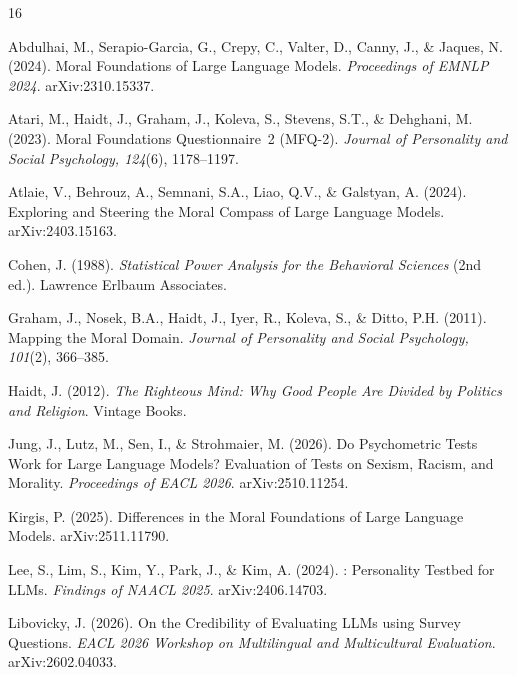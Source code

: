 \documentclass{article}
\begin{document}
\begin{thebibliography}{16}

Abdulhai, M., Serapio-Garcia, G., Crepy, C., Valter, D., Canny, J., \& Jaques, N. (2024).
\newblock Moral Foundations of Large Language Models.
\newblock \emph{Proceedings of EMNLP 2024}. arXiv:2310.15337.

Atari, M., Haidt, J., Graham, J., Koleva, S., Stevens, S.T., \& Dehghani, M. (2023).
\newblock Moral Foundations Questionnaire~2 ({MFQ-2}).
\newblock \emph{Journal of Personality and Social Psychology, 124}(6), 1178--1197.

Atlaie, V., Behrouz, A., Semnani, S.A., Liao, Q.V., \& Galstyan, A. (2024).
\newblock Exploring and Steering the Moral Compass of Large Language Models.
\newblock arXiv:2403.15163.

Cohen, J. (1988).
\newblock \emph{Statistical Power Analysis for the Behavioral Sciences} (2nd ed.).
\newblock Lawrence Erlbaum Associates.

Graham, J., Nosek, B.A., Haidt, J., Iyer, R., Koleva, S., \& Ditto, P.H. (2011).
\newblock Mapping the Moral Domain.
\newblock \emph{Journal of Personality and Social Psychology, 101}(2), 366--385.

Haidt, J. (2012).
\newblock \emph{The Righteous Mind: Why Good People Are Divided by Politics and Religion}.
\newblock Vintage Books.

Jung, J., Lutz, M., Sen, I., \& Strohmaier, M. (2026).
\newblock Do Psychometric Tests Work for Large Language Models? Evaluation of Tests on Sexism, Racism, and Morality.
\newblock \emph{Proceedings of EACL 2026}. arXiv:2510.11254.

Kirgis, P. (2025).
\newblock Differences in the Moral Foundations of Large Language Models.
\newblock arXiv:2511.11790.

Lee, S., Lim, S., Kim, Y., Park, J., \& Kim, A. (2024).
: Personality Testbed for {LLMs}.
\newblock \emph{Findings of NAACL 2025}. arXiv:2406.14703.

Libovicky, J. (2026).
\newblock On the Credibility of Evaluating {LLMs} using Survey Questions.
\newblock \emph{EACL 2026 Workshop on Multilingual and Multicultural Evaluation}. arXiv:2602.04033.


\end{thebibliography}
\end{document}
